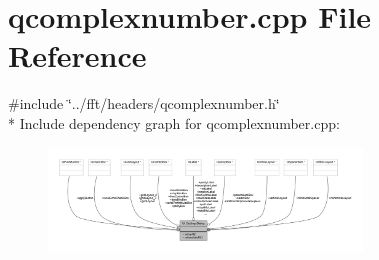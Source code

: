 \hypertarget{a00113}{\section{qcomplexnumber.\+cpp File Reference}
\label{a00113}
}
{\ttfamily \#include \char`\"{}../fft/headers/qcomplexnumber.\+h\char`\"{}}\\*
Include dependency graph for qcomplexnumber.\+cpp\+:
\nopagebreak
\begin{figure}[H]
\begin{center}
\leavevmode
\includegraphics[width=236pt]{db/d53/a00321}
\end{center}
\end{figure}
